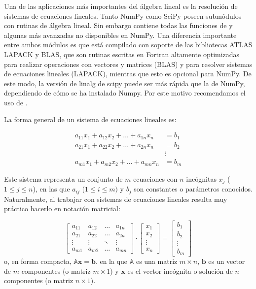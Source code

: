 Una de las aplicaciones más importantes del álgebra lineal es la resolución de sistemas de ecuaciones lineales. Tanto NumPy como SciPy poseen submódulos con rutinas de álgebra lineal. Sin embargo  contiene todas las funciones de  y algunas más avanzadas no disponibles en NumPy. Una diferencia importante entre ambos módulos es que  está compilado con soporte de las bibliotecas ATLAS LAPACK y BLAS, que son rutinas escritas en Fortran altamente optimizadas para realizar operaciones con vectores y matrices (BLAS) y para resolver sistemas de ecuaciones lineales (LAPACK), mientras que esto es opcional para NumPy. De este modo, la versión de linalg de scipy puede ser más rápida que la de NumPy, dependiendo de cómo se ha instalado Numpy. Por este motivo recomendamos el uso de .

La forma general de un sistema de ecuaciones lineales es:

\begin{align*}
 a_{11} x_1 + a_{12} x_2 + \ldots + a_{1n} x_n &= b_1 \\
 a_{21} x_1 + a_{22} x_2 + \ldots + a_{2n} x_n &= b_2 \\
  &\vdots  \\
 a_{m1} x_1 + a_{m2} x_2 + \ldots + a_{mn} x_n &= b_m 
\end{align*}

Este sistema representa un conjunto de $m$ ecuaciones con $n$ incógnitas $x_j$ ($1 \leq j \leq n$), en  las que $a_{ij}$ ($1 \leq i \leq m)$ y $b_j$  son constantes o parámetros conocidos. Naturalmente, al trabajar con sistemas de ecuaciones lineales resulta muy práctico hacerlo en notación matricial:

\begin{equation} \label{eq:sl1}
 \begin{bmatrix}
 a_{11} & a_{12} & \ldots & a_{1n}  \\
 a_{21} & a_{22} & \ldots & a_{2n}  \\
 \vdots & \vdots & \ddots & \vdots  \\
 a_{m1} & a_{m2} & \ldots & a_{mn}  
 \end{bmatrix} \cdot
\begin{bmatrix}
 x_1 \\
 x_2 \\
 \vdots \\
 x_n
\end{bmatrix}
=
\begin{bmatrix}
 b_1 \\
 b_2 \\
 \vdots \\
 b_m
\end{bmatrix}
\end{equation} 
o, en forma compacta, $\mathbb{A} \bm{x} = \bm{b}$. en la que $\mathbb{A}$ es una matriz $m \times n$, $\bm{b}$ es un vector de $m$ componentes (o matriz $m \times 1$) y $\bm{x}$ es el vector incógnita o solución de $n$ componentes (o matriz $n \times 1$).


